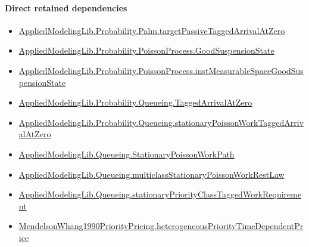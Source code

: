 \documentclass[10pt]{article}
\begin{document}
\paragraph{Direct retained dependencies}
\begin{itemize}\raggedright
\item \hyperlink{governing-declaration-5a10835f452c324b}{Applied\allowbreak{}Modeling\allowbreak{}Lib.\allowbreak{}Probability.\allowbreak{}Palm.\allowbreak{}target\allowbreak{}Passive\allowbreak{}Tagged\allowbreak{}Arrival\allowbreak{}At\allowbreak{}Zero}
\item \hyperlink{governing-declaration-ab1cfe37ad8c32b0}{Applied\allowbreak{}Modeling\allowbreak{}Lib.\allowbreak{}Probability.\allowbreak{}Poisson\allowbreak{}Process.\allowbreak{}Good\allowbreak{}Suspension\allowbreak{}State}
\item \hyperlink{governing-declaration-a8385d799d0a4d16}{Applied\allowbreak{}Modeling\allowbreak{}Lib.\allowbreak{}Probability.\allowbreak{}Poisson\allowbreak{}Process.\allowbreak{}inst\allowbreak{}Measurable\allowbreak{}Space\allowbreak{}Good\allowbreak{}Suspension\allowbreak{}State}
\item \hyperlink{governing-declaration-a69bedb5b0d420c6}{Applied\allowbreak{}Modeling\allowbreak{}Lib.\allowbreak{}Probability.\allowbreak{}Queueing.\allowbreak{}Tagged\allowbreak{}Arrival\allowbreak{}At\allowbreak{}Zero}
\item \hyperlink{governing-declaration-e9116e504d73a45c}{Applied\allowbreak{}Modeling\allowbreak{}Lib.\allowbreak{}Probability.\allowbreak{}Queueing.\allowbreak{}stationary\allowbreak{}Poisson\allowbreak{}Work\allowbreak{}Tagged\allowbreak{}Arrival\allowbreak{}At\allowbreak{}Zero}
\item \hyperlink{governing-declaration-62a268164b6ae28b}{Applied\allowbreak{}Modeling\allowbreak{}Lib.\allowbreak{}Queueing.\allowbreak{}Stationary\allowbreak{}Poisson\allowbreak{}Work\allowbreak{}Path}
\item \hyperlink{governing-declaration-9bede4eaca6a95fb}{Applied\allowbreak{}Modeling\allowbreak{}Lib.\allowbreak{}Queueing.\allowbreak{}multiclass\allowbreak{}Stationary\allowbreak{}Poisson\allowbreak{}Work\allowbreak{}Rest\allowbreak{}Law}
\item \hyperlink{library-prerequisite-8f1ec496ea0db7a0}{Applied\allowbreak{}Modeling\allowbreak{}Lib.\allowbreak{}Queueing.\allowbreak{}stationary\allowbreak{}Priority\allowbreak{}Class\allowbreak{}Tagged\allowbreak{}Work\allowbreak{}Requirement}
\item \hyperlink{paper-prerequisite-d3f248a0395e1c76}{Mendelson\allowbreak{}Whang1990\allowbreak{}Priority\allowbreak{}Pricing.\allowbreak{}heterogeneous\allowbreak{}Priority\allowbreak{}Time\allowbreak{}Dependent\allowbreak{}Price}
\end{itemize}
\end{document}
